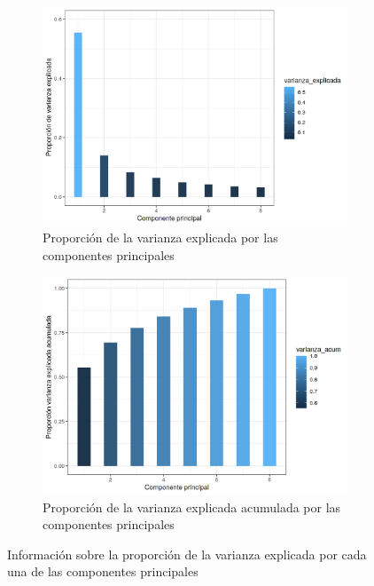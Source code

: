 \documentclass[11pt]{article}
\begin{document}
\begin{figure}[H]
    \centering
    \begin{subfigure}{0.45\textwidth}
        \includegraphics[width=1.0\textwidth]{pca_var_explicada}
        \caption{Proporción de la varianza explicada por las componentes principales}
    \end{subfigure}
    \begin{subfigure}{0.45\textwidth}
        \includegraphics[width=1.0\textwidth]{pca_var_explicada_acumulada}
        \caption{Proporción de la varianza explicada acumulada por las componentes principales}
    \end{subfigure}

    \caption{Información sobre la proporción de la varianza explicada por cada una de las componentes principales}
\end{figure}
\end{document}
